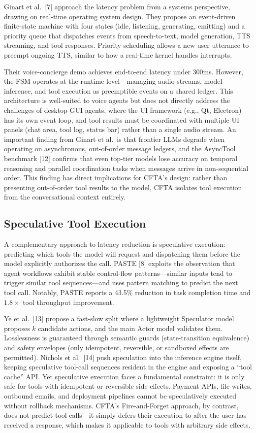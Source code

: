 \documentclass[numbered,mediumone,traditional]{oup-authoring-template}
\begin{document}
Ginart et al.\ [7] approach the latency problem from a systems perspective, drawing on real-time operating system design. They propose an event-driven finite-state machine with four states (idle, listening, generating, emitting) and a priority queue that dispatches events from speech-to-text, model generation, TTS streaming, and tool responses. Priority scheduling allows a new user utterance to preempt ongoing TTS, similar to how a real-time kernel handles interrupts.

Their voice-concierge demo achieves end-to-end latency under 300ms. However, the FSM operates at the runtime level---managing audio streams, model inference, and tool execution as preemptible events on a shared ledger. This architecture is well-suited to voice agents but does not directly address the challenges of desktop GUI agents, where the UI framework (e.g., Qt, Electron) has its own event loop, and tool results must be coordinated with multiple UI panels (chat area, tool log, status bar) rather than a single audio stream. An important finding from Ginart et al.\ is that frontier LLMs degrade when operating on asynchronous, out-of-order message ledgers, and the AsyncTool benchmark [12] confirms that even top-tier models lose accuracy on temporal reasoning and parallel coordination tasks when messages arrive in non-sequential order. This finding has direct implications for CFTA's design: rather than presenting out-of-order tool results to the model, CFTA isolates tool execution from the conversational context entirely.

\subsection{Speculative Tool Execution}

A complementary approach to latency reduction is speculative execution: predicting which tools the model will request and dispatching them before the model explicitly authorizes the call. PASTE [8] exploits the observation that agent workflows exhibit stable control-flow patterns---similar inputs tend to trigger similar tool sequences---and uses pattern matching to predict the next tool call. Notably, PASTE reports a 43.5\% reduction in task completion time and $1.8\times$ tool throughput improvement.

Ye et al.\ [13] propose a fast-slow split where a lightweight Speculator model proposes $k$ candidate actions, and the main Actor model validates them. Losslessness is guaranteed through semantic guards (state-transition equivalence) and safety envelopes (only idempotent, reversible, or sandboxed effects are permitted). Nichols et al.\ [14] push speculation into the inference engine itself, keeping speculative tool-call sequences resident in the engine and exposing a ``tool cache'' API. Yet speculative execution faces a fundamental constraint: it is only safe for tools with idempotent or reversible side effects. Payment APIs, file writes, outbound emails, and deployment pipelines cannot be speculatively executed without rollback mechanisms. CFTA's Fire-and-Forget approach, by contrast, does not predict tool calls---it simply defers their execution to after the user has received a response, which makes it applicable to tools with arbitrary side effects.
\end{document}
